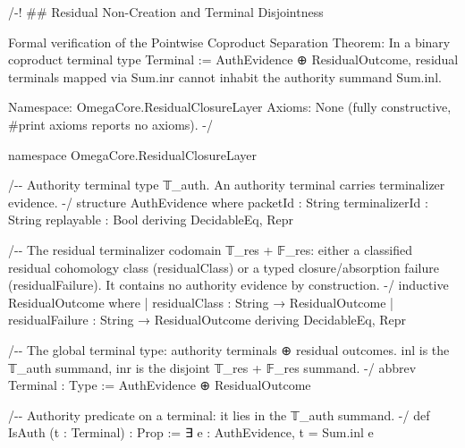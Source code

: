 \documentclass[
  10pt,
]{article}
\newenvironment{Shaded}{}{}
\newcommand{\NormalTok}[1]{#1}
\begin{document}
\begin{Shaded}
\begin{Highlighting}[]
\NormalTok{/{-}!}
\NormalTok{\#\# Residual Non{-}Creation and Terminal Disjointness}

\NormalTok{Formal verification of the Pointwise Coproduct Separation Theorem:}
\NormalTok{In a binary coproduct terminal type \textasciigrave{}Terminal := AuthEvidence ⊕ ResidualOutcome\textasciigrave{},}
\NormalTok{residual terminals mapped via \textasciigrave{}Sum.inr\textasciigrave{} cannot inhabit the authority summand \textasciigrave{}Sum.inl\textasciigrave{}.}

\NormalTok{Namespace: \textasciigrave{}OmegaCore.ResidualClosureLayer\textasciigrave{}}
\NormalTok{Axioms: None (fully constructive, \textasciigrave{}\#print axioms\textasciigrave{} reports no axioms).}
\NormalTok{{-}/}

\NormalTok{namespace OmegaCore.ResidualClosureLayer}

\NormalTok{/{-}{-} Authority terminal type \textasciigrave{}𝕋\_auth\textasciigrave{}. An authority terminal carries terminalizer evidence. {-}/}
\NormalTok{structure AuthEvidence where}
\NormalTok{  packetId : String}
\NormalTok{  terminalizerId : String}
\NormalTok{  replayable : Bool}
\NormalTok{  deriving DecidableEq, Repr}

\NormalTok{/{-}{-} The residual terminalizer codomain \textasciigrave{}𝕋\_res + 𝔽\_res\textasciigrave{}: either a classified residual}
\NormalTok{    cohomology class (\textasciigrave{}residualClass\textasciigrave{}) or a typed closure/absorption failure (\textasciigrave{}residualFailure\textasciigrave{}).}
\NormalTok{    It contains no authority evidence by construction. {-}/}
\NormalTok{inductive ResidualOutcome where}
\NormalTok{  | residualClass : String → ResidualOutcome}
\NormalTok{  | residualFailure : String → ResidualOutcome}
\NormalTok{  deriving DecidableEq, Repr}

\NormalTok{/{-}{-} The global terminal type: authority terminals \textasciigrave{}⊕\textasciigrave{} residual outcomes.}
\NormalTok{    \textasciigrave{}inl\textasciigrave{} is the \textasciigrave{}𝕋\_auth\textasciigrave{} summand, \textasciigrave{}inr\textasciigrave{} is the disjoint \textasciigrave{}𝕋\_res + 𝔽\_res\textasciigrave{} summand. {-}/}
\NormalTok{abbrev Terminal : Type := AuthEvidence ⊕ ResidualOutcome}

\NormalTok{/{-}{-} Authority predicate on a terminal: it lies in the \textasciigrave{}𝕋\_auth\textasciigrave{} summand. {-}/}
\NormalTok{def IsAuth (t : Terminal) : Prop := ∃ e : AuthEvidence, t = Sum.inl e}


\end{Highlighting}
\end{Shaded}
\end{document}

